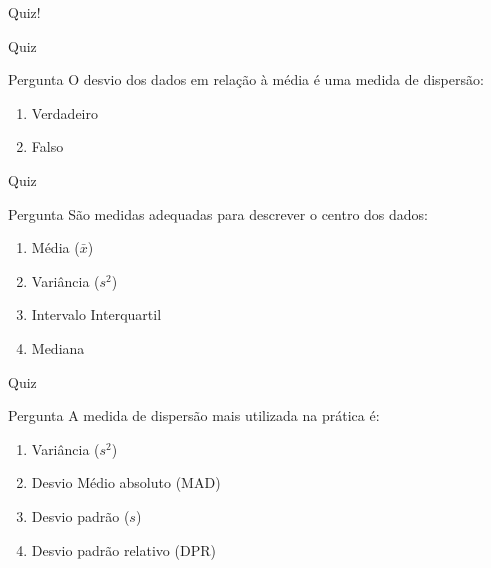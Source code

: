 \documentclass{beamer}
\begin{document}

\begin{frame}
  \begin{center}
    \LARGE
    Quiz!
  \end{center}
\end{frame}

\begin{frame}{\scriptsize Quiz}
  \begin{block}{Pergunta}
    \footnotesize
    O desvio dos dados em relação à média é uma medida de dispersão:

    \bigskip
    \begin{enumerate}
      \scriptsize
    \item Verdadeiro
    \item \alert<2>{Falso}
    \end{enumerate}
  \end{block}
\end{frame}

\begin{frame}{\scriptsize Quiz}
  \begin{block}{Pergunta}
    \footnotesize
    São medidas adequadas para descrever o centro dos dados:

    \bigskip
    \begin{enumerate}
      \scriptsize
    \item \alert<2>{Média ($\bar{x}$)}
    \item Variância ($s^2$)
    \item Intervalo Interquartil
    \item \alert<2>{Mediana}
    \end{enumerate}
  \end{block}
\end{frame}

\begin{frame}{\scriptsize Quiz}
  \begin{block}{Pergunta}
    \footnotesize
    A medida de dispersão mais utilizada na prática é:

    \bigskip
    \begin{enumerate}
      \scriptsize
    \item Variância ($s^2$)
    \item Desvio Médio absoluto (MAD)
    \item \alert<2>{Desvio padrão ($s$)}
    \item Desvio padrão relativo (DPR)
    \end{enumerate}
  \end{block}
\end{frame}
\end{document}
